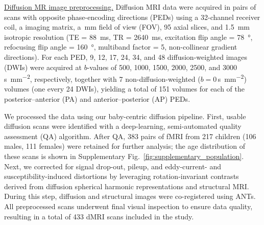 \noindent\underline{Diffusion MR image preprocessing.}
Diffusion MRI data were acquired in pairs of scans with opposite phase-encoding directions (PEDs) using a 32-channel receiver coil, a  imaging matrix, a \,\unit{\milli\meter} field of view (FOV), 95 axial slices, and \SI{1.5}{\milli\meter} isotropic resolution (TE = \SI{88}{\milli\second}, TR = \SI{2640}{\milli\second}, excitation flip angle = \SI{78}{\degree}, refocusing flip angle = \SI{160}{\degree}, multiband factor = 5, non-collinear gradient directions). 
For each PED, \num{9}, \num{12}, \num{17}, \num{24}, \num{34}, and \num{48} diffusion-weighted images (DWIs) were acquired at $b$-values of 500, 1000, 1500, 2000, 2500, and 3000\,\si{\second\per\milli\meter\squared}, respectively, together with 7 non-diffusion-weighted ($b = 0$\,\si{\second\per\milli\meter\squared}) volumes (one every 24 DWIs), yielding a total of 151 volumes for each of the posterior--anterior (PA) and anterior--posterior (AP) PEDs.

We processed the data using our baby-centric diffusion pipeline\cite{wu2021automated}. First, usable diffusion scans were identified with a deep-learning, semi-automated quality assessment (QA) algorithm\cite{liu2019multi}. After QA, 383 pairs of fMRI from 217 children (106 males, 111 females) were retained for further analysis; the age distribution of these scans is shown in Supplementary Fig.~\ref{fig:supplementary_population}. Next, we corrected for signal drop-out, pileup, and eddy-current- and susceptibility-induced distortions by leveraging rotation-invariant contrasts derived from diffusion spherical harmonic representations and structural MRI\cite{ahmad2020fast}. During this step, diffusion and structural images were co-registered using ANTs\cite{avants2009advanced}. All preprocessed scans underwent final visual inspection to ensure data quality, resulting in a total of 433 dMRI scans included in the study.

